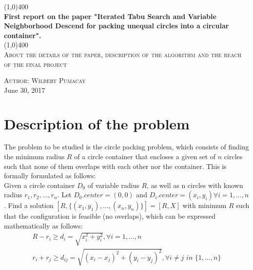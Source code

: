 \documentclass{article}
\begin{document}
\begin{titlepage}
	\begin{center}
	\line(1,0){400}\\
	\huge{\bfseries First report on the paper "Iterated Tabu Search and 		Variable Neighborhood Descend for packing unequal circles into a circular container".}\\
	\line(1,0){400}\\
	\textsc{\Large About the details of the paper, description of the algorithm and the reach of the final project}
	\end{center}
	\vspace{5in}
	\begin{flushright}
	\textsc{\large Author: Wilbert Pumacay\\}
	June 30, 2017
	\end{flushright}
	
\end{titlepage}

\section{Description of the problem}\label{sec:intro}%
The problem to be studied is the circle packing problem, which consists of finding the minimum radius $R$ of a circle container that encloses a given set of $n$ circles such that none of them overlaps with each other nor the container. This is formally formulated as follows:\\

Given a circle container $D_{0}$ of variable radius $R$, as well as n circles with known radius $r_{1},r_{2},\hdots,r_{n}$. Let $D_{0}.center=(0,0)$ and $D_{i}.center=(x_{i},y_{i}) \forall i = 1,\hdots,n$. Find a solution 
$[R,\lbrace(x_{1},y_{1}),\hdots,(x_{n},y_{n})\rbrace]=[R,X]$ with minimum $R$ such that the configuration is feasible (no overlaps), which can be expressed mathematically as follows:
\begin{gather*}
R - r_{i} \geq d_{i} = \sqrt{x^{2}_{i} + y^{2}_{i}}, \forall i=1,\hdots,n \\
r_{i} + r_{j} \geq d_{ij} = \sqrt{(x_{i}-x_{j})^{2} + (y_{i}-y_{j})^{2}}, \forall i \neq j \textit{ in } 
\lbrace1,\hdots,n\rbrace \\
\end{gather*}
\end{document}
